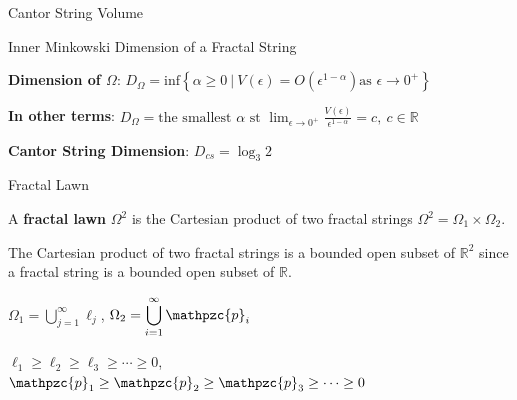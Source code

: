 \documentclass{if-beamer}
\newcommand{\R}{\mathbb{R}}
\newcommand{\Om}{\Omega}
\newcommand{\p}{\mathpzc{p}}
\begin{document}
\begin{frame}{Cantor String Volume}
	\begin{center}
	\end{center}
\end{frame}



\begin{frame}{Inner Minkowski Dimension of a Fractal String}

\begin{definition}
{\bf Dimension of $\Om$}: $D_\Om =\text{inf}\left\{ \alpha \geq 0\ |\ V(\epsilon)=O\left(\epsilon^{1-\alpha}\right) \text{as  } \epsilon \rightarrow 0^{+}\right\}$
\end{definition}

\pause
\vspace{.2 in}

{\bf In other terms}: $D_\Om = \text{the smallest  }\alpha \text{ st } \displaystyle \lim_{\epsilon \to 0^{+}} \frac{V(\epsilon)}{\epsilon^{1-\alpha}}=c, \ c\in \mathbb{R}$

\pause
\vspace{.2 in}

{\bf Cantor String Dimension}: $D_{cs} = \log_3 2$

\end{frame}



\begin{frame}{Fractal Lawn}

	\begin{definition}
	A {\bf fractal lawn} $\Om^2$ is the Cartesian product of two fractal strings $\Om^2=\Om_1\times\Om_2$.
	\end{definition}
	
	\pause
	\vspace{.2 in}
	
	The Cartesian product of two fractal strings is a bounded open subset of $\R^2$ since a fractal string is a bounded open subset of $\R$.
	\pause
	\vspace{.2 in}
	
$\Om_1 = \displaystyle\bigcup_{j = 1}^\infty\ell_j$, \quad $\Om_2 = \displaystyle\bigcup_{i = 1}^\infty \p_i$
\pause
\vspace{.2 in}

$\ell_1 \geq \ell_2 \geq \ell_3 \geq \cdots \geq 0$, \quad $\p_1 \geq \p_2 \geq \p_3 \geq \cdots \geq 0$

\end{frame}
\end{document}
